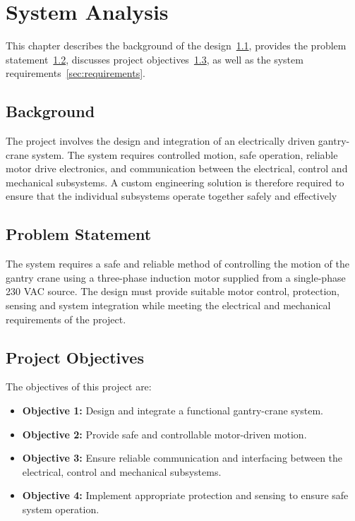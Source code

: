 \chapter{System Analysis}
\label{ch:system-analysis}
This chapter describes the background of the design~\ref{sec:background}, provides the problem statement~\ref{sec:problem-statement}, discusses project objectives~\ref{sec:objectives}, as well as the system requirements~\ref{sec:requirements}.

\section{Background}
\label{sec:background}

The project involves the design and integration of an electrically driven gantry-crane system.
 The system requires controlled motion, safe operation, reliable motor drive electronics, and 
 communication between the electrical, control and mechanical subsystems. A custom engineering
solution is therefore required to ensure that the individual subsystems operate together safely 
and effectively

\section{Problem Statement}
\label{sec:problem-statement}

The system requires a safe and reliable method of controlling the motion of the gantry crane 
using a three-phase induction motor supplied from a single-phase 230 VAC source. The design must
 provide suitable motor control, protection, sensing and system integration while meeting the 
 electrical and mechanical requirements of the project.

\section{Project Objectives}
\label{sec:objectives}

The objectives of this project are:
\begin{itemize}
    \item \textbf{Objective 1:} Design and integrate a functional gantry-crane system.
    \item \textbf{Objective 2:} Provide safe and controllable motor-driven motion.
    \item \textbf{Objective 3:} Ensure reliable communication and interfacing between 
    the electrical, control and mechanical subsystems.
    \item \textbf{Objective 4:} Implement appropriate protection and sensing to ensure 
    safe system operation.
\end{itemize}

